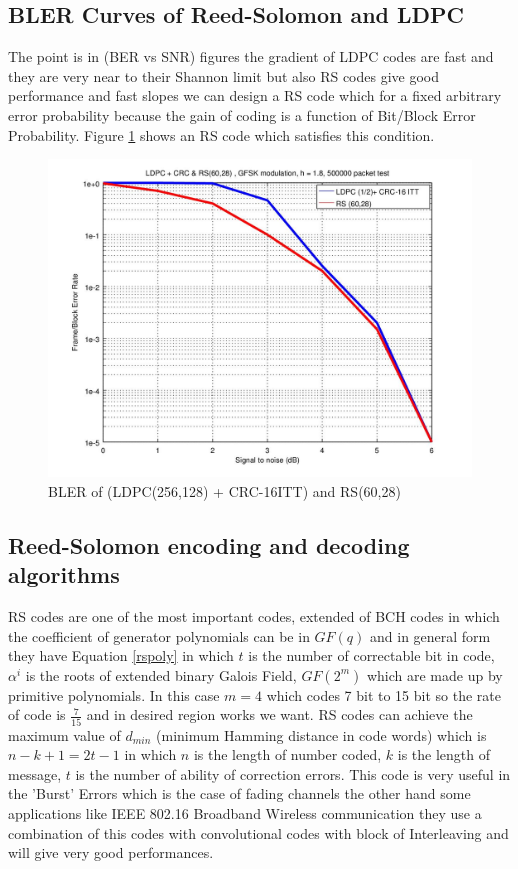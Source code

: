 \subsection{BLER Curves of Reed-Solomon and LDPC}

The point is in (BER vs SNR) figures the gradient of LDPC codes are fast and they are very near to their Shannon limit but also RS codes give good performance and fast slopes we can design a RS code which for a fixed arbitrary error probability because the gain of coding is a function of Bit/Block Error Probability. Figure \ref{rs} shows an RS code which satisfies this condition.


\begin{figure}[htbp]
\centering
\includegraphics[scale=0.6]{Figures/LDPC_RS.jpg}
\caption[LDPC vs RS code BLER]{BLER of (LDPC(256,128) + CRC-16ITT) and RS(60,28)}
\label{rs}
\end{figure}


\subsection{Reed-Solomon encoding and decoding algorithms}
RS codes are one of the most important codes, extended of BCH codes in which the coefficient of generator polynomials can be in $GF(q)$ and in general form they have Equation \ref{rspoly} in which $t$ is the number of correctable bit in code, $\alpha^{i}$ is the roots of extended binary Galois Field, $GF(2^{m})$ which are made up by primitive polynomials. In this case $m = 4$ which codes 7 bit to 15 bit so the rate of code is $\frac{7}{15}$ and in desired region works we want. RS codes can achieve the maximum value of $d_{min}$ (minimum Hamming distance in code words) which is $n-k+1 = 2t - 1$ in which $n$ is the length of number coded, $k$ is the length of message, $t$ is the number of ability of correction errors. This code is very useful in the 'Burst' Errors which is the case of fading channels the other hand some applications like IEEE 802.16 Broadband Wireless communication they use a combination of this codes with convolutional codes with block of Interleaving and will give very good performances.

